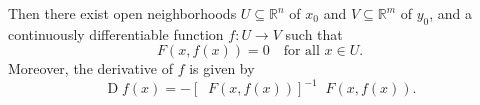 \documentclass[12pt]{article}
\newcommand{\dotprod}[2]{#1\mathbin{\cdot}#2}
\newcommand{\pa}[1]{\left( #1 \right)}
\newcommand{\br}[1]{\left[ #1 \right]}
\newcommand{\st}{\text{s.t.}}
\begin{document}
Then there exist open neighborhoods \( U \subseteq \mathbb{R}^n \) of \( x_0 \) and \( V \subseteq \mathbb{R}^m \) of \( y_0 \), and a continuously differentiable function \( f : U \to V \) such that
\[
F(x, f(x)) = 0 \quad \text{for all } x \in U.
\]
Moreover, the derivative of \( f \) is given by
\[
\mathop{D}f(x) = -\br{\mathop{D_y} F(x, f(x))}^{-1} \mathop{D_x} F(x, f(x)).
\]


%
%





\end{document}
